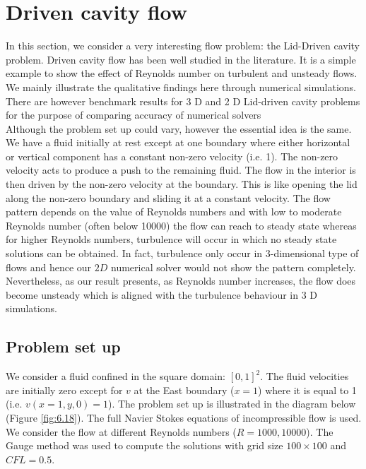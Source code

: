 \newpage
\section{Driven cavity flow}
In this section, we consider a very interesting flow problem: the Lid-Driven cavity problem. Driven cavity flow has been well studied in the literature. It is a simple example to show the effect of Reynolds number on turbulent and unsteady flows. We mainly illustrate the qualitative findings here through numerical simulations. There are however benchmark results for 3 D and 2 D Lid-driven cavity problems for the purpose of comparing accuracy of numerical solvers \cite{botella1998benchmark, erturk2005numerical, bruneau20062d}\\

Although the problem set up could vary, however the essential idea is the same. We have a fluid initially at rest except at one boundary where either horizontal or vertical component has a constant non-zero velocity (i.e. 1). The non-zero velocity acts to produce a push to the remaining fluid. The flow in the interior is then driven by the non-zero velocity at the boundary. This is like opening the lid along the non-zero boundary and sliding it at a constant velocity. The flow pattern depends on the value of Reynolds numbers and with low to moderate Reynolds number (often below 10000) the flow can reach to steady state whereas for higher Reynolds numbers, turbulence will occur in which no steady state solutions can be obtained. In fact, turbulence only occur in 3-dimensional type of flows and hence our $2D$ numerical solver would not show the pattern completely. Nevertheless, as our result presents, as Reynolds number increases, the flow does become unsteady which is aligned with the turbulence behaviour in 3 D simulations.

\subsection{Problem set up}
We consider a fluid confined in the square domain: $[0,1]^2$. The fluid velocities are initially zero except for $v$ at the East boundary ($x=1$) where it is equal to 1 (i.e. $v(x=1,y,0)=1$). The problem set up is illustrated in the diagram below (Figure \ref{fig:6.18}). The full Navier Stokes equations of incompressible flow is used. We consider the flow at different Reynolds numbers ($R = 1000, 10000$). The Gauge method was used to compute the solutions with grid size $100 \times 100$ and $CFL = 0.5$. \\


